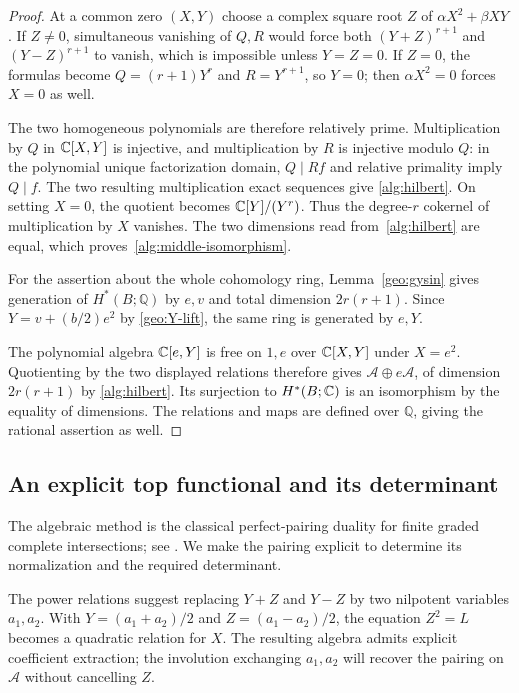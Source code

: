 \begin{proof}
At a common zero $(X,Y)$ choose a complex square root $Z$ of
$\alpha X^2+\beta XY$.  If $Z\ne0$, simultaneous vanishing of $Q,R$
would force both $(Y+Z)^{r+1}$ and $(Y-Z)^{r+1}$ to vanish, which is
impossible unless $Y=Z=0$.  If $Z=0$, the formulas become
$Q=(r+1)Y^r$ and $R=Y^{r+1}$, so $Y=0$; then $\alpha X^2=0$
forces $X=0$ as well.

The two homogeneous polynomials are therefore relatively prime.
Multiplication by $Q$ in $\mathbb C[X,Y]$ is injective, and multiplication by
$R$ is injective modulo $Q$: in the polynomial unique factorization
domain, $Q\mid Rf$ and relative primality imply $Q\mid f$.
The two resulting multiplication exact sequences give
\eqref{alg:hilbert}.  On setting $X=0$, the quotient becomes
$\mathbb C[Y]/(Y^r)$.  Thus the degree-$r$ cokernel of multiplication by $X$
vanishes.  The two dimensions read from~\eqref{alg:hilbert} are equal,
which proves~\eqref{alg:middle-isomorphism}.

For the assertion about the whole cohomology ring,
Lemma~\ref{geo:gysin} gives generation of $H^*(B;\mathbb Q)$
by $e,v$ and total dimension $2r(r+1)$.
Since $Y=v+(b/2)e^2$ by \eqref{geo:Y-lift}, the same ring is
generated by $e,Y$.

The polynomial algebra $\mathbb C[e,Y]$ is free on $1,e$ over $\mathbb C[X,Y]$
under $X=e^2$.  Quotienting by the two displayed relations therefore
gives $\mathcal A\oplus e\mathcal A$, of dimension $2r(r+1)$ by
\eqref{alg:hilbert}.  Its surjection to $H^*(B;\mathbb C)$ is an
isomorphism by the equality of dimensions.  The relations and maps are
defined over $\mathbb Q$, giving the rational assertion as well.
\end{proof}

\subsection{An explicit top functional and its determinant}

The algebraic method is the classical perfect-pairing duality for
finite graded complete intersections; see
\citet[Corollary~3.5 and the discussion following Theorem~9.1]
{Huneke1999}.
We make the pairing explicit to determine its normalization and
the required determinant.

The power relations suggest replacing $Y+Z$ and $Y-Z$ by two nilpotent
variables $a_1,a_2$.  With $Y=(a_1+a_2)/2$ and $Z=(a_1-a_2)/2$,
the equation $Z^2=L$ becomes a quadratic relation for $X$.
The resulting algebra admits explicit coefficient extraction; the
involution exchanging $a_1,a_2$ will recover the pairing on $\mathcal A$
without cancelling $Z$.

